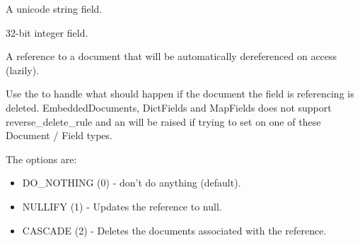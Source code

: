 \documentclass[letterpaper,10pt,english]{sphinxmanual}
\begin{document}
\begin{fulllineitems}
\begin{fulllineitems}
\end{fulllineitems}


\begin{fulllineitems}
\label{\detokenize{logentry:logentry.LogEntry.keyword}}
A unicode string field.

\end{fulllineitems}


\begin{fulllineitems}
\label{\detokenize{logentry:logentry.LogEntry.objects}}
\end{fulllineitems}


\begin{fulllineitems}
\label{\detokenize{logentry:logentry.LogEntry.timestamp}}
32-bit integer field.

\end{fulllineitems}


\begin{fulllineitems}
\label{\detokenize{logentry:logentry.LogEntry.user}}
A reference to a document that will be automatically dereferenced on
access (lazily).

Use the  to handle what should happen if the document
the field is referencing is deleted.  EmbeddedDocuments, DictFields and
MapFields does not support reverse\_delete\_rule and an 
will be raised if trying to set on one of these Document / Field types.

The options are:
\begin{itemize}
\item {} 
DO\_NOTHING (0)  - don't do anything (default).

\item {} 
NULLIFY    (1)  - Updates the reference to null.

\item {} 
CASCADE    (2)  - Deletes the documents associated with the reference.


\end{itemize}
\end{fulllineitems}
\end{fulllineitems}
\end{document}
